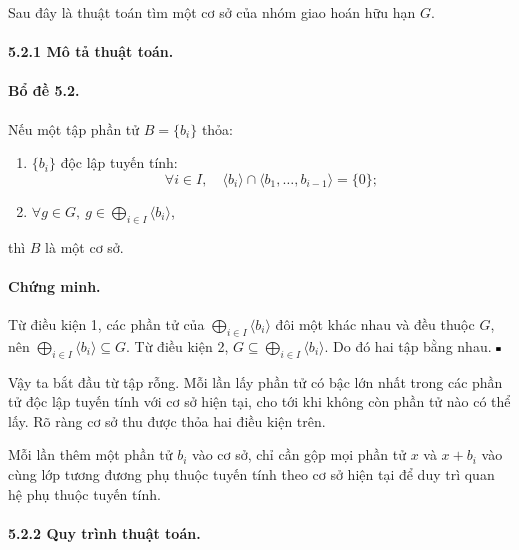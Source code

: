 \documentclass[11pt]{article}
\newcommand{\qedmark}{\hfill\rule{0.7ex}{0.7ex}}
\begin{document}
Sau đây là thuật toán tìm một cơ sở của nhóm giao hoán hữu hạn \(G\).

\paragraph{5.2.1 Mô tả thuật toán.}

\paragraph{Bổ đề 5.2.}
Nếu một tập phần tử \(B=\{b_i\}\) thỏa:
\begin{enumerate}
  \item \(\{b_i\}\) độc lập tuyến tính:
  \[
    \forall i\in I,\quad
    \langle b_i\rangle\cap\langle b_1,\ldots,b_{i-1}\rangle=\{0\};
  \]
  \item \(\forall g\in G,\ g\in\bigoplus_{i\in I}\langle b_i\rangle\),
\end{enumerate}
thì \(B\) là một cơ sở.

\paragraph{Chứng minh.}
Từ điều kiện 1, các phần tử của \(\bigoplus_{i\in I}\langle b_i\rangle\) đôi một
khác nhau và đều thuộc \(G\), nên
\(\bigoplus_{i\in I}\langle b_i\rangle\subseteq G\). Từ điều kiện 2,
\(G\subseteq\bigoplus_{i\in I}\langle b_i\rangle\). Do đó hai tập bằng nhau.
\(\qedmark\)

Vậy ta bắt đầu từ tập rỗng. Mỗi lần lấy phần tử có bậc lớn nhất trong các phần
tử độc lập tuyến tính với cơ sở hiện tại, cho tới khi không còn phần tử nào có
thể lấy. Rõ ràng cơ sở thu được thỏa hai điều kiện trên.

Mỗi lần thêm một phần tử \(b_i\) vào cơ sở, chỉ cần gộp mọi phần tử \(x\) và
\(x+b_i\) vào cùng lớp tương đương phụ thuộc tuyến tính theo cơ sở hiện tại để
duy trì quan hệ phụ thuộc tuyến tính.

\paragraph{5.2.2 Quy trình thuật toán.}
\end{document}
